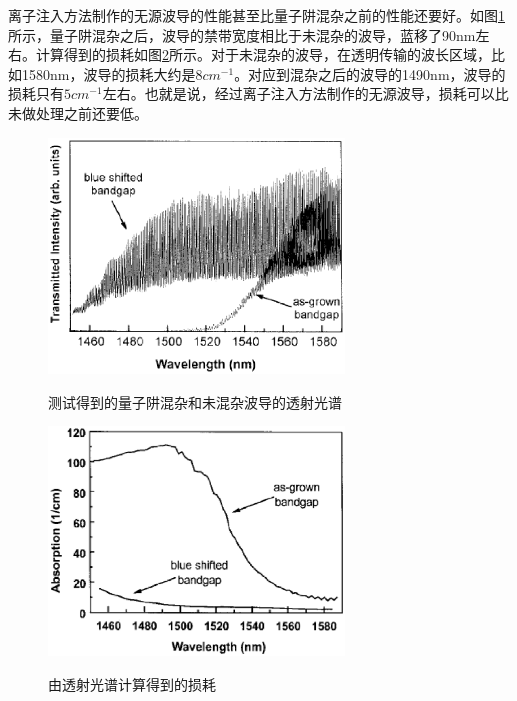 \documentclass[oneside]{ZJUthesis}
\begin{document}
离子注入方法制作的无源波导的性能甚至比量子阱混杂之前的性能还要好。如图\ref{fig_implantation_wg_test}所示，量子阱混杂之后，波导的禁带宽度相比于未混杂的波导，蓝移了90nm左右。计算得到的损耗如图\ref{fig_implantation_wg_loss}所示。对于未混杂的波导，在透明传输的波长区域，比如1580nm，波导的损耗大约是$8cm^{-1}$。对应到混杂之后的波导的1490nm，波导的损耗只有$5cm^{-1}$左右。也就是说，经过离子注入方法制作的无源波导，损耗可以比未做处理之前还要低。

\begin{figure}[!h]
  \centering
  \includegraphics[width=0.7\textwidth]{./Pictures/implantation_wg_test.eps}\\
  \caption{测试得到的量子阱混杂和未混杂波导的透射光谱}
  \label{fig_implantation_wg_test}
\end{figure}

\begin{figure}[!h]
  \centering
  \includegraphics[width=0.7\textwidth]{./Pictures/implantation_wg_loss.eps}\\
  \caption{由透射光谱计算得到的损耗}
  \label{fig_implantation_wg_loss}
\end{figure}
\end{document}
